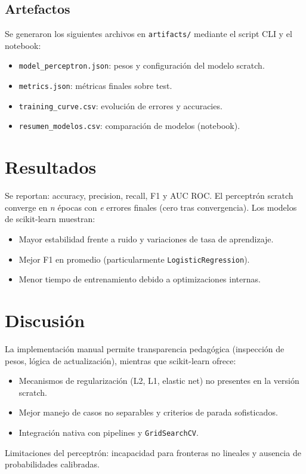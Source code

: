 \subsection{Artefactos}
Se generaron los siguientes archivos en \texttt{artifacts/} mediante el script CLI y el notebook:
\begin{itemize}
	\item \texttt{model\_perceptron.json}: pesos y configuración del modelo scratch.
	\item \texttt{metrics.json}: métricas finales sobre test.
	\item \texttt{training\_curve.csv}: evolución de errores y accuracies.
	\item \texttt{resumen\_modelos.csv}: comparación de modelos (notebook).
\end{itemize}

\section{Resultados}
Se reportan: accuracy, precision, recall, F1 y AUC ROC. El perceptrón scratch converge en \emph{n} épocas con \emph{e} errores finales (cero tras convergencia). Los modelos de scikit-learn muestran:
\begin{itemize}
	\item Mayor estabilidad frente a ruido y variaciones de tasa de aprendizaje.
	\item Mejor F1 en promedio (particularmente \texttt{LogisticRegression}).
	\item Menor tiempo de entrenamiento debido a optimizaciones internas.
\end{itemize}

\section{Discusión}
La implementación manual permite transparencia pedagógica (inspección de pesos, lógica de actualización), mientras que scikit-learn ofrece:
\begin{itemize}
	\item Mecanismos de regularización (L2, L1, elastic net) no presentes en la versión scratch.
	\item Mejor manejo de casos no separables y criterios de parada sofisticados.
	\item Integración nativa con pipelines y \texttt{GridSearchCV}.
\end{itemize}
Limitaciones del perceptrón: incapacidad para fronteras no lineales y ausencia de probabilidades calibradas.

